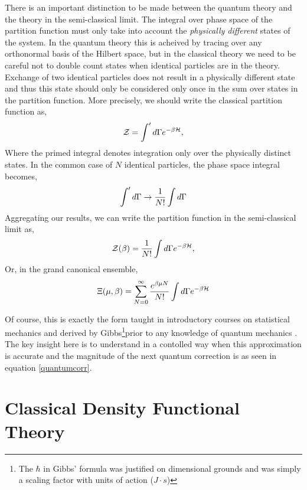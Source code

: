 There is an important distinction to be made between the quantum theory and the
theory in the semi-classical limit.  The integral over phase space of the
partition function must only take into account the \textit{physically
different} states of the system.  In the quantum theory this is acheived by
tracing over any orthonormal basis of the Hilbert space, but in the classical
theory we need to be careful not to double count states when identical
particles are in the theory.  Exchange of two identical particles does not
result in a physically different state and thus this state should only be
considered only once in the sum over states in the partition function.  More
precisely, we should write the classical partition function as,
%
\begin{equation} \mathcal{Z} = \int^\prime d\Gamma e^{-\beta \mathcal{H}}, \end{equation}
%
Where the primed integral denotes integration only over the physically distinct
states. In the common case of $N$ identical particles, the phase space integral
becomes, 
%
\begin{equation} \int^\prime d\Gamma \rightarrow \frac{1}{N!}\int d\Gamma
\end{equation}
%
Aggregating our results, we can write the partition function in the
semi-classical limit as,
%
\begin{equation} \mathcal{Z}(\beta) = \frac{1}{N!}\int d\Gamma e^{-\beta \mathcal{H}},
\end{equation}
%
Or, in the grand canonical ensemble,
%
\begin{equation} \Xi(\mu, \beta) = \sum_{N = 0}^\infty \frac{e^{\beta\mu N}}{N!}
\int d\Gamma e^{-\beta \mathcal{H}} \end{equation}

Of course, this is exactly the form taught in introductory courses on
statistical mechanics and derived by Gibbs\footnote{The $\hbar$ in Gibbs'
formula was justified on dimensional grounds and was simply a scaling factor
with units of action ($J\cdot s$)}prior to any knowledge of quantum mechanics
\cite{Gibbs}.  The key insight here is to understand in a contolled way when
this approximation is accurate and the magnitude of the next quantum correction
is as seen in equation \ref{quantumcorr}.

\section{Classical Density Functional Theory}  %


